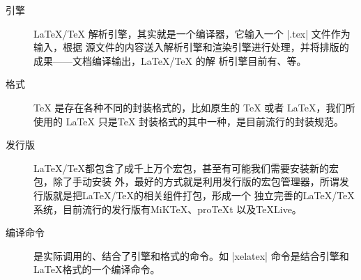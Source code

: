 
\begin{description}
  \item[引擎] \LaTeX{}/\TeX{} 解析引擎，其实就是一个编译器，它输入一个 |.tex| 文件作为输入，根据
  源文件的内容送入解析引擎和渲染引擎进行处理，并将排版的成果——文档编译输出，\LaTeX{}/\TeX{} 的解
  析引擎目前有\pdfTeX{}、\XeLaTeX{}等。
  \item[格式] \TeX{} 是存在各种不同的封装格式的，比如原生的 \TeX{} 或者 \LaTeX{}，我们所使用的
    \LaTeX{} 只是\TeX{} 封装格式的其中一种，是目前流行的封装规范。
  \item[发行版] \LaTeX/\TeX{}都包含了成千上万个宏包，甚至有可能我们需要安装新的宏包，除了手动安装
    外，最好的方式就是利用发行版的宏包管理器，所谓发行版就是把\LaTeX/\TeX{}的相关组件打包，形成一个
    独立完善的\LaTeX/\TeX{}系统，目前流行的发行版有MiKTeX、proTeXt 以及TeXLive。
  \item[编译命令] 是实际调用的、结合了引擎和格式的命令。如 |xelatex| 命令是结合\XeTeX{}引擎和
  \LaTeX{}格式的一个编译命令。
\end{description}


%
%
%
%
%
%


